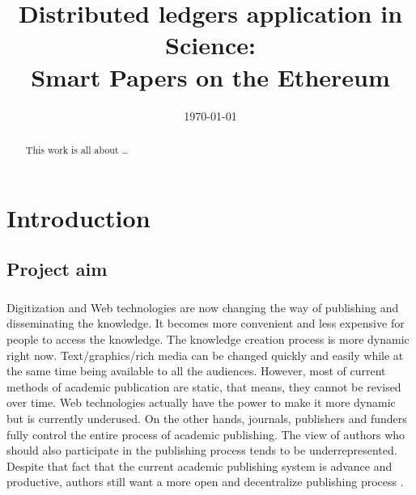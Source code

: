\documentclass[openany,12pt]{ecsthesis}      %
\begin{document}
\frontmatter
\title      {Distributed ledgers application in Science: \\
Smart Papers on the Ethereum}



\addresses  {\deptname\\\univname}
\date       {\today}
			
\subject    {}
\keywords   {}
\maketitle
\begin{abstract}
This work is all about \dots
\end{abstract}
\tableofcontents
\listoffigures
\listoftables
\mainmatter
\chapter{Introduction}
\section{Project aim}
\paragraph{}Digitization and Web technologies are now changing the way of publishing and disseminating the knowledge.
It becomes more convenient and less expensive for people to access the knowledge. 
The knowledge creation process is more dynamic right now. 
Text/graphics/rich media can be changed quickly and easily while at the same time being available to all the audiences.
However, most of current methods of academic publication are static, that means, they cannot be revised over time\cite{heller2014dynamic}. 
Web technologies actually have the power to make it more dynamic but is currently underused. On the other hands, journals, publishers and funders fully control
the entire process of academic publishing. The view of authors who should also participate in the publishing process tends to be underrepresented. 
Despite that fact that the current academic publishing system is advance and productive, 
authors still want a more open and decentralize publishing process \cite{d2018authors}.
\end{document}
